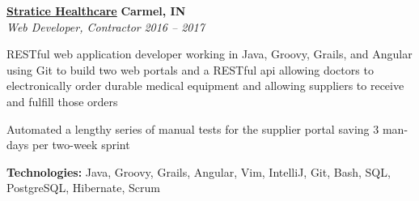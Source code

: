 %
    \headerrow
        {\textbf{\href{https://www.straticehealthcare.com/}{Stratice Healthcare}}}
        {\textbf{Carmel, IN}}
    \\
    \headerrow
        {\emph{Web Developer, Contractor}}
        {\emph{2016 -- 2017}}
    \begin{itemize*}
        \item RESTful web application developer working in Java, Groovy, Grails, and Angular
                using Git to build two web portals and a RESTful api allowing doctors to electronically order durable medical equipment and
                allowing suppliers to receive and fulfill those orders
        \item Automated a lengthy series of manual tests for the supplier portal saving 3 man-days per two-week sprint
    \end{itemize*}

    \hspace{1.0em}
        {\textbf{Technologies:} Java, Groovy, Grails, Angular, Vim, IntelliJ, Git, Bash, SQL, PostgreSQL, Hibernate, Scrum}
